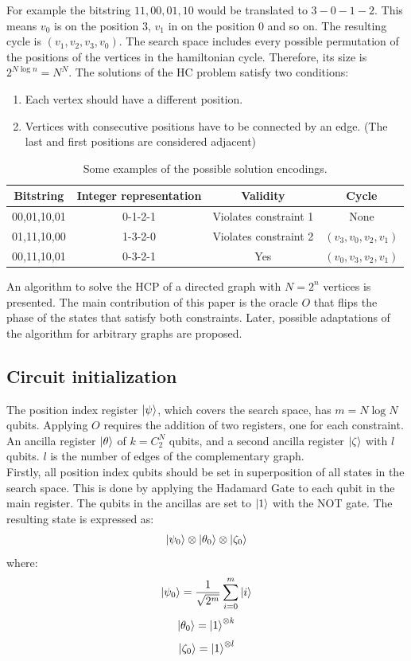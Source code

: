 \documentclass[10pt,a4paper]{article}
\begin{document}
For example the bitstring $11,00,01,10$ would be translated to $3-0-1-2$. This means $v_0$ is on the position $3$, $v_1$ in on the position $0$ and so on. The resulting cycle is $(v_1, v_2, v_3, v_0)$.
The search space includes every possible permutation of the positions of the vertices in the hamiltonian cycle. Therefore, its size is $2^{N\log n} = N^N$. The solutions of the HC problem satisfy two conditions:
\begin{enumerate}
\item Each vertex should have a different position.
\item Vertices with consecutive positions have to be connected by an edge. (The last and first positions are considered adjacent)
\end{enumerate}
\begin{table}[htbp]
    \centering
    \begin{tabular}{|c|c|c|c|}
        \hline
        Bitstring & Integer representation & Validity & Cycle \\
        \hline
        00,01,10,01 & 0-1-2-1 & Violates constraint 1 & None \\
        01,11,10,00 & 1-3-2-0 & Violates constraint 2 & $(v_3, v_0, v_2, v_1)$ \\
        00,11,10,01 & 0-3-2-1 & Yes & $(v_0, v_3, v_2, v_1)$\\
        \hline
    \end{tabular}
    \label{tab:example}
    \caption{Some examples of the possible solution encodings.}
\end{table}

An algorithm to solve the HCP of a directed graph with $N = 2^n$ vertices is presented. The main contribution of this paper is the oracle $O$ that flips the phase of the states that satisfy both constraints. Later, possible adaptations of the algorithm for arbitrary graphs are proposed.

\subsection{Circuit initialization}
The position index register $\ket{\psi}$, which covers the search space, has $m = N\log N$ qubits. Applying $O$ requires the addition of two registers, one for each constraint. An ancilla register $\ket{\theta}$ of $k = C^N_2$ qubits, and a second ancilla register $\ket{\zeta}$ with $l$ qubits. $l$ is the number of edges of the  complementary graph.\\
Firstly, all position index qubits should be set in superposition of all states in the search space. This is done by applying the Hadamard Gate to each qubit in the main register. The qubits in the ancillas are set to $\ket{1}$ with the NOT gate. The resulting state is expressed as:
$$\ket{\psi_0} \otimes \ket{\theta_0} \otimes \ket{\zeta_0}$$
where:
$$\ket{\psi_0} = \frac{1}{\sqrt{2^m}}\sum_{i=0}^{m} \ket{i}$$
$$\ket{\theta_0} = \ket{1}^{\otimes k}$$
$$\ket{\zeta_0} = \ket{1}^{\otimes l}$$
\end{document}
